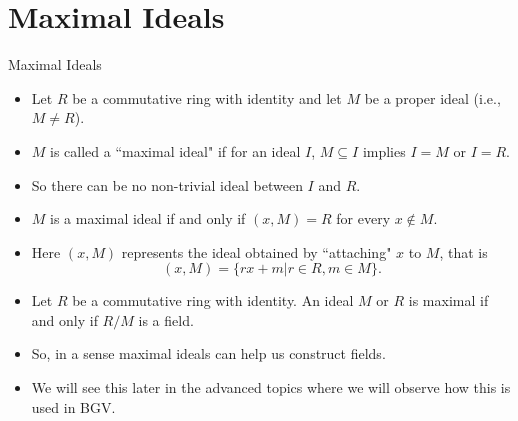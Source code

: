 \documentclass[ %
 10pt, xcolor={dvipsnames,svgnames,x11names,hyperref},
   hyperref={colorlinks=true,citecolor=green,linkcolor=DarkRed,urlcolor=ProcessBlue,anchorcolor=blue}
  ]{beamer}
\newenvironment{stepitemize}{\begin{itemize}[<+->]}{\end{itemize} }
\begin{document}
\section{Maximal Ideals}
\begin{frame}{Maximal Ideals}
    \begin{stepitemize}
        \item Let $R$ be a commutative ring with identity and let $M$ be a proper ideal (i.e., $M \neq R$). 
        \item $M$ is called a ``maximal ideal" if for an ideal $I$, $M\subseteq I$ implies $I=M$ or $I=R$.    
\item So there can be no non-trivial ideal between $I$ and $R$. 
\item  $M$ is a maximal ideal if and only if $(x,M)=R$ for every $x\not \in M$. 
\item Here $(x,M)$ represents the ideal obtained by ``attaching" $x$ to $M$, that is 
$$(x,M) = \{rx+m|r\in R, m\in M\}.$$
\item Let $R$ be a commutative ring with identity. An ideal $M$ or $R$ is maximal if and only if $R/M$ is a field. 
\item So, in a sense maximal ideals can help us construct fields. 
\item We will see this later in the advanced topics where we will observe how this is used in BGV.
\end{stepitemize}
\end{frame}
\end{document}
